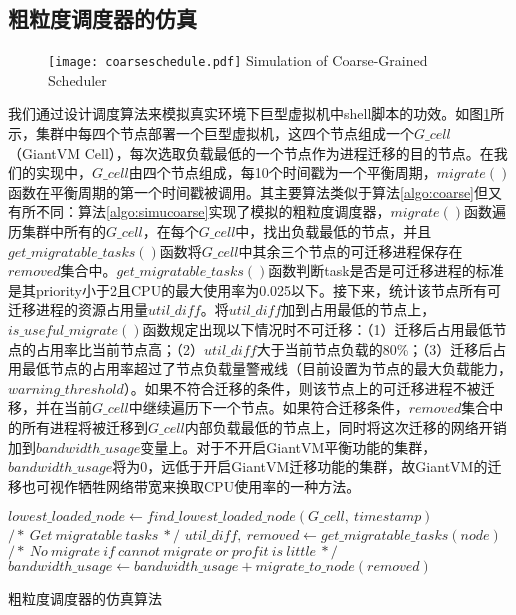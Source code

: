 \subsection{粗粒度调度器的仿真}
\begin{figure}[!htp]
  \centering
  \texttt{[image: coarseschedule.pdf]}
    {Simulation of Coarse-Grained Scheduler}
  \label{fig:simucoarse}
\end{figure}
我们通过设计调度算法来模拟真实环境下巨型虚拟机中shell脚本的功效。如图\ref{fig:simucoarse}所示，集群中每四个节点部署一个巨型虚拟机，这四个节点组成一个$G\_cell$（GiantVM Cell），每次选取负载最低的一个节点作为进程迁移的目的节点。在我们的实现中，$G\_cell$由四个节点组成，每10个时间戳为一个平衡周期，$migrate()$函数在平衡周期的第一个时间戳被调用。其主要算法类似于算法\ref{algo:coarse}但又有所不同：算法\ref{algo:simucoarse}实现了模拟的粗粒度调度器，$migrate()$函数遍历集群中所有的$G\_cell$，在每个$G\_cell$中，找出负载最低的节点，并且$get\_migratable\_tasks()$函数将$G\_cell$中其余三个节点的可迁移进程保存在$removed$集合中。$get\_migratable\_tasks()$函数判断task是否是可迁移进程的标准是其priority小于2且CPU的最大使用率为0.025以下。接下来，统计该节点所有可迁移进程的资源占用量$util\_diff$。将$util\_diff$加到占用最低的节点上，$is\_useful\_migrate()$函数规定出现以下情况时不可迁移：（1）迁移后占用最低节点的占用率比当前节点高；（2）$util\_diff$大于当前节点负载的80\%；（3）迁移后占用最低节点的占用率超过了节点负载量警戒线（目前设置为节点的最大负载能力，$warning\_threshold$）。如果不符合迁移的条件，则该节点上的可迁移进程不被迁移，并在当前$G\_cell$中继续遍历下一个节点。如果符合迁移条件，$removed$集合中的所有进程将被迁移到$G\_cell$内部负载最低的节点上，同时将这次迁移的网络开销加到$bandwidth\_usage$变量上。对于不开启GiantVM平衡功能的集群，$bandwidth\_usage$将为0，远低于开启GiantVM迁移功能的集群，故GiantVM的迁移也可视作牺牲网络带宽来换取CPU使用率的一种方法。

\begin{algorithm}[h]
\begin{algorithmic}[1]
\State $lowest\_loaded\_node \gets find\_lowest\_loaded\_node(G\_cell,\  timestamp)$
\State $/*\ Get\ migratable\ tasks\ */$
\State $util\_diff,\  removed \gets get\_migratable\_tasks(node)$
\State $/*\ No\ migrate\ if\ cannot\ migrate\ or\ profit\ is\ little\ */$
\State $bandwidth\_usage \gets bandwidth\_usage + migrate\_to\_node(removed)$
\EndIf
\EndFor
\EndFor
\end{algorithmic}
\caption{粗粒度调度器的仿真算法}
\label{algo:simucoarse}
\end{algorithm}

